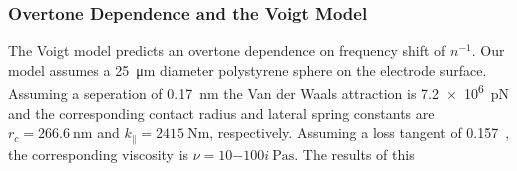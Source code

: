 \documentclass[floatfix,superscriptaddress,a4paper,notitlepage]{revtex4-1}
\begin{document}
\subsubsection{Overtone Dependence and the Voigt Model}

The Voigt model predicts an overtone dependence on frequency shift of
$n^{-1}$.  Our model assumes a \SI{25}{\micro\meter} diameter polystyrene
sphere on the electrode surface.  Assuming a seperation of
\SI{0.17}{\nano\meter} the Van der Waals attraction is
\SI{7.2e6}{\pico\newton} and the corresponding contact radius and lateral
spring constants are $r_c=\SI{266.6}{\nano\meter}$ and $k_\parallel =
\SI{2415}{\newton\meter}$, respectively.  Assuming a loss tangent of
0.157~\cite{}, the corresponding viscosity is $\nu =
\SI{10-100i}{\pascal\second}$.  The results of this 
\end{document}
